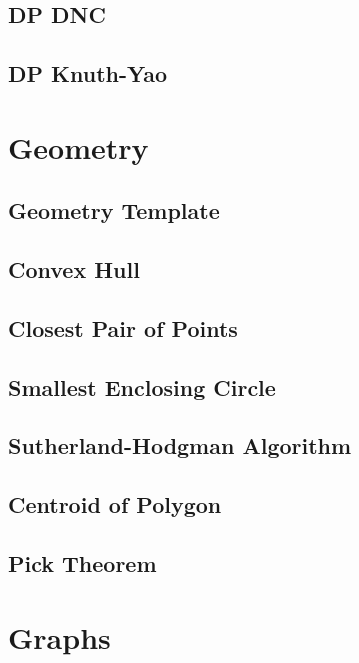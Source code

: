 \subsection{DP DNC}

\subsection{DP Knuth-Yao}

\section{Geometry}
\subsection{Geometry Template}

\subsection{Convex Hull}

\subsection{Closest Pair of Points}

\subsection{Smallest Enclosing Circle}

\subsection{Sutherland-Hodgman Algorithm}

\subsection{Centroid of Polygon}

\subsection{Pick Theorem}

\section{Graphs}
